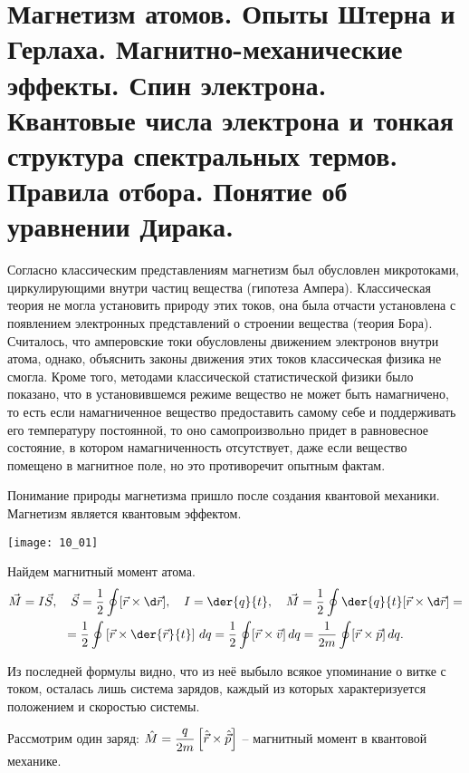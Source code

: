\chapter{Магнетизм атомов. Опыты Штерна и Герлаха. Магнитно-механические 
эффекты. Спин электрона. Квантовые числа электрона и тонкая структура 
спектральных термов. Правила отбора. Понятие об уравнении Дирака.}

Согласно классическим представлениям магнетизм был обусловлен микротоками,
циркулирующими внутри частиц вещества (гипотеза Ампера). Классическая теория не
могла установить природу этих токов, она была отчасти установлена с появлением
электронных представлений о строении вещества (теория Бора). Считалось, что
амперовские токи обусловлены движением электронов внутри атома, однако,
объяснить законы движения этих токов классическая физика не смогла. Кроме того,
методами классической статистической физики было показано, что в установившемся
режиме вещество не может быть намагничено, то есть если намагниченное вещество
предоставить самому себе и поддерживать его температуру постоянной, то оно
самопроизвольно придет в равновесное состояние, в котором намагниченность
отсутствует, даже если вещество помещено в магнитное поле, но это противоречит
опытным фактам.

Понимание природы магнетизма пришло после создания квантовой механики. Магнетизм
является квантовым эффектом.

\begin{minipage}{.27\textwidth}
    \texttt{[image: 10\_01]}
\end{minipage}
\begin{minipage}{.68\textwidth}
    Найдем магнитный момент атома.
    \begin{gather*}
        \vec{M} = I\vec{S}, \quad \vec{S} = \frac{1}{2}\oint [\vec{r}\times\d
        \vec{r}], \quad I = \der{q}{t}, \quad \vec{M} = \frac{1}{2}\oint \der{q}{t}[\vec{r}\times\d\vec{r}] = \\
        = \frac{1}{2}\oint\left[ \vec{r}\times\der{\vec{r}}{t} \right]\,dq =
        \frac{1}{2}\oint[\vec{r}\times\vec{v}]\,dq = \frac{1}{2m}\oint
        [\vec{r}\times\vec{p}]\,dq.
    \end{gather*}

Из последней формулы видно, что из неё выбыло всякое упоминание о витке с
током, осталась лишь система зарядов, каждый из которых характеризуется
положением и скоростью системы.
\end{minipage}

Рассмотрим один заряд: \( \displaystyle \hat{M} = \frac{q}{2m}\left[\hat{\vec{r}}\times
\hat{\vec{p}}\right] \) -- магнитный момент в квантовой механике.


